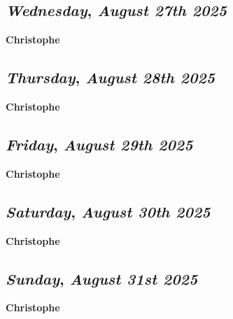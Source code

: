 \def\day{\textit{August 27th 2025}}
\def\weekday{\textit{Wednesday}}
\subsection*{\weekday, \day}
\textbf {Christophe}

\def\day{\textit{August 28th 2025}}
\def\weekday{\textit{Thursday}}
\subsection*{\weekday, \day}
\textbf {Christophe}

\def\day{\textit{August 29th 2025}}
\def\weekday{\textit{Friday}}
\subsection*{\weekday, \day}
\textbf {Christophe}

\def\day{\textit{August 30th 2025}}
\def\weekday{\textit{Saturday}}
\subsection*{\weekday, \day}
\textbf {Christophe}

\def\day{\textit{August 31st 2025}}
\def\weekday{\textit{Sunday}}
\subsection*{\weekday, \day}
\textbf {Christophe}
